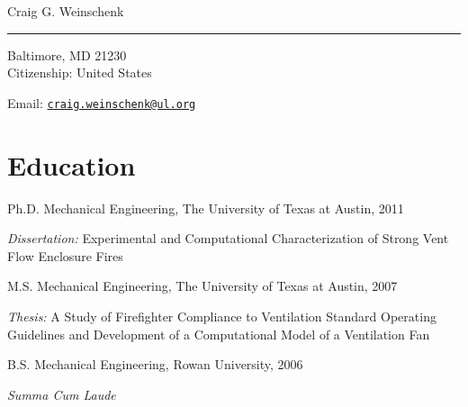 \documentclass[10pt,letterpaper]{article}
\def\name{Craig G. Weinschenk}
\renewenvironment{itemize}{
  \begin{list}{}{
    \setlength{\leftmargin}{1.5em}
  }
}{
  \end{list}
}
\begin{document}
{\huge \name} \\
\noindent\rule{17cm}{0.4pt}


\vspace{0.25in}

\begin{minipage}[t]{0.5\textwidth}
  Baltimore, MD  21230\\
  Citizenship: United States
\end{minipage}
\begin{minipage}[t]{0.5\textwidth}
  Email: \href{mailto:craig.weinschenk@ul.org} {\tt craig.weinschenk@ul.org}\\

\end{minipage}

\section*{Education}

\begin{itemize}
  \item Ph.D. Mechanical Engineering, The University of Texas at Austin, 2011
    \begin{itemize}
      \item \textit{Dissertation:} Experimental and Computational Characterization of Strong Vent Flow Enclosure Fires
    \end{itemize}

  \item M.S. Mechanical Engineering, The University of Texas at Austin, 2007
    \begin{itemize}
      \item \textit{Thesis:} A Study of Firefighter Compliance to Ventilation Standard Operating Guidelines and Development of a Computational Model of a Ventilation Fan
    \end{itemize}

  \item B.S. Mechanical Engineering, Rowan University, 2006
  \begin{itemize}
    \item \textit{Summa Cum Laude}
  \end{itemize}
\end{itemize}
\end{document}
